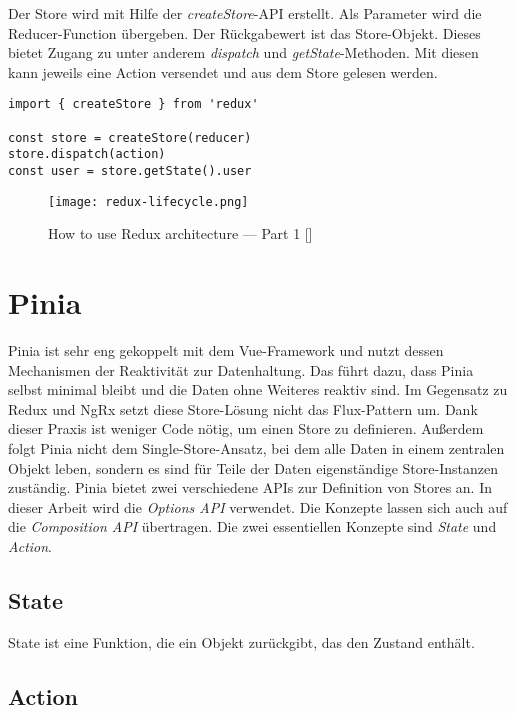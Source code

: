 Der Store wird mit Hilfe der \textit{createStore}-API erstellt. Als Parameter wird die Reducer-Function übergeben. Der Rückgabewert ist das Store-Objekt. Dieses bietet Zugang zu unter anderem \textit{dispatch} und \textit{getState}-Methoden. Mit diesen kann jeweils eine Action versendet und aus dem Store gelesen werden.

\begin{lstlisting}
import { createStore } from 'redux'

const store = createStore(reducer)
store.dispatch(action)
const user = store.getState().user
\end{lstlisting}

\begin{figure}[H]
  \texttt{[image: redux-lifecycle.png]}
  \caption{How to use Redux architecture — Part 1 [\citeyear{reduxStateActionReducers}]}
  \label{fig:redux-lifecycle}
\end{figure}

\section{Pinia}

Pinia ist sehr eng gekoppelt mit dem Vue-Framework und nutzt dessen Mechanismen der Reaktivität zur Datenhaltung. Das führt dazu, dass Pinia selbst minimal bleibt und die Daten ohne Weiteres reaktiv sind. Im Gegensatz zu Redux und NgRx setzt diese Store-Lösung nicht das Flux-Pattern um. Dank dieser Praxis ist weniger Code nötig, um einen Store zu definieren. Außerdem folgt Pinia nicht dem Single-Store-Ansatz, bei dem alle Daten in einem zentralen Objekt leben, sondern es sind für Teile der Daten eigenständige Store-Instanzen zuständig. Pinia bietet zwei verschiedene APIs zur Definition von Stores an. In dieser Arbeit wird die \textit{Options API} verwendet. Die Konzepte lassen sich auch auf die \textit{Composition API} übertragen.\cite{piniaDefiningAStore} Die zwei essentiellen Konzepte sind \textit{State} und \textit{Action}.

\subsection{State}

State ist eine Funktion, die ein Objekt zurückgibt, das den Zustand enthält.

\subsection{Action}

